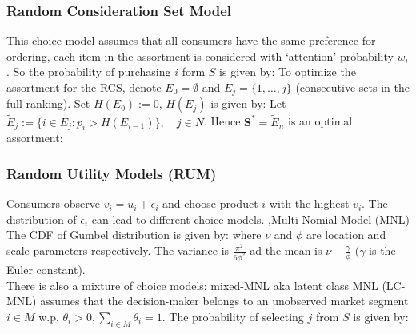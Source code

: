 \documentclass[10pt]{report}
\begin{document}
\subsubsection{Random Consideration Set Model}
This choice model assumes that all consumers have the same preference for ordering, each item in the assortment is  considered with `attention' probability $w_i$. 
So the probability of purchasing $i$ form $S$ is given by:
To optimize the assortment for the RCS, denote $E_0=\emptyset$ and $E_j=\{1,\ldots,j\}$ (consecutive sets in the full ranking). 
Set $H(E_0):=0$, $H(E_j)$ is given by:
Let $\tilde{E}_j:=\{i\in E_j:p_i>H(E_{i-1})\},\quad j\in N$. Hence $\mathbf{S}^{*}=\tilde{E}_{n}$ is an optimal assortment:
\subsubsection{Random Utility Models (RUM)}
Consumers observe $v_i=u_i+\epsilon_i$ and choose product $i$ with the highest $v_i$. The distribution of $\epsilon_i$ can lead to different choice models.
\sep{Multi-Nomial Model (MNL)}
The CDF of Gumbel distribution is given by:
where $\nu$ and $\phi$ are location and scale parameters respectively. The variance is $\frac{\pi^2}{6\phi^2}$ ad the mean is $\nu+\frac{\gamma}{\phi}$ ($\gamma$ is the
Euler constant).\\
There is also a mixture of choice models: mixed-MNL aka latent class MNL (LC-MNL) assumes that the decision-maker belongs to an unobserved market
segment $i\in M$ w.p. $\theta_i>0,\sum_{i\in M}\theta_i=1$. The probability of selecting $j$ from $S$ is given by:
\end{document}
